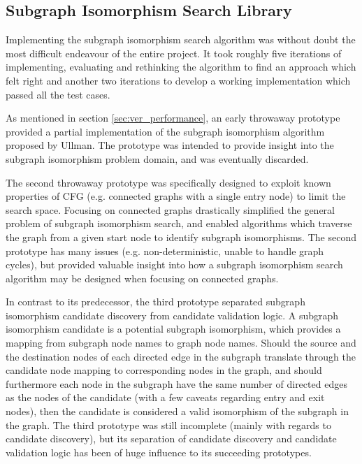 
\subsection{Subgraph Isomorphism Search Library}
\label{sec:impl_subgraph_isomorphism_search_library}

Implementing the subgraph isomorphism search algorithm was without doubt the most difficult endeavour of the entire project. It took roughly five iterations of implementing, evaluating and rethinking the algorithm to find an approach which felt right and another two iterations to develop a working implementation which passed all the test cases.

As mentioned in section \ref{sec:ver_performance}, an early throwaway prototype provided a partial implementation of the subgraph isomorphism algorithm proposed by Ullman. The prototype was intended to provide insight into the subgraph isomorphism problem domain, and was eventually discarded.

The second throwaway prototype was specifically designed to exploit known properties of CFG (e.g. connected graphs with a single entry node) to limit the search space. Focusing on connected graphs drastically simplified the general problem of subgraph isomorphism search, and enabled algorithms which traverse the graph from a given start node to identify subgraph isomorphisms. The second prototype has many issues (e.g. non-deterministic, unable to handle graph cycles), but provided valuable insight into how a subgraph isomorphism search algorithm may be designed when focusing on connected graphs.

In contrast to its predecessor, the third prototype separated subgraph isomorphism candidate discovery from candidate validation logic. A subgraph isomorphism candidate is a potential subgraph isomorphism, which provides a mapping from subgraph node names to graph node names. Should the source and the destination nodes of each directed edge in the subgraph translate through the candidate node mapping to corresponding nodes in the graph, and should furthermore each node in the subgraph have the same number of directed edges as the nodes of the candidate (with a few caveats regarding entry and exit nodes), then the candidate is considered a valid isomorphism of the subgraph in the graph. The third prototype was still incomplete (mainly with regards to candidate discovery), but its separation of candidate discovery and candidate validation logic has been of huge influence to its succeeding prototypes.

